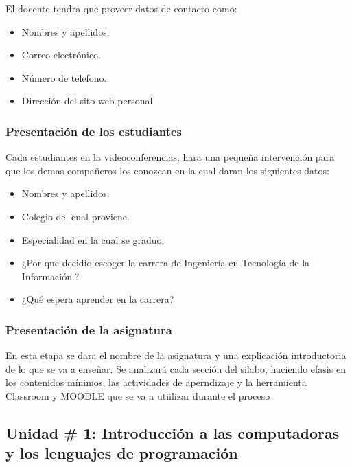 \documentclass[a4paper,12pt,spanish]{article}
\begin{document}
El docente tendra que proveer datos de contacto como:

\begin{itemize}
\item[\checkmark] Nombres y apellidos.
\item[\checkmark] Correo electrónico.
\item[\checkmark] Número de telefono.
\item[\checkmark] Dirección del sito web personal
\end{itemize}


\subsubsection{Presentación de los estudiantes}
\label{sec:presentacion-de-los}

Cada estudiantes en la videoconferencias, hara una pequeña intervención para que los demas compañeros los conozcan en la cual daran los siguientes datos:

\begin{itemize}
\item[\checkmark] Nombres y apellidos.
\item[\checkmark] Colegio del cual proviene.
\item[\checkmark] Especialidad en la cual se graduo.
\item[\checkmark] ¿Por que decidio escoger la carrera de Ingeniería en Tecnología de la Información.?
\item[\checkmark] ¿Qué espera aprender en la carrera?
  
\end{itemize}



\subsubsection{Presentación de la asignatura}
\label{sec:presentacion-de-la}

En esta etapa se dara el nombre de la asignatura y una explicación introductoria de lo que se va a enseñar. Se analizará cada sección del silabo, haciendo efasis en los contenidos mínimos, las actividades de aperndizaje y la herramienta Classroom y MOODLE que se va a utiilizar durante el proceso 



\subsection{Unidad \# 1: Introducción a las computadoras y los lenguajes de programación}
\label{sec:intr-las-comp}
\end{document}
